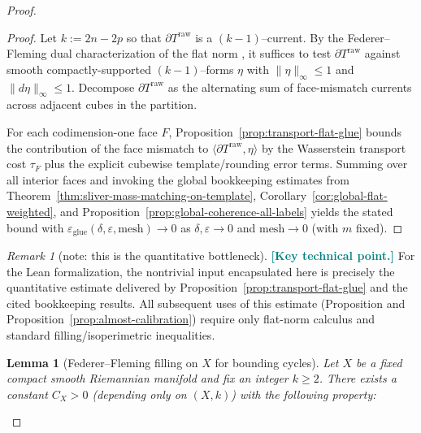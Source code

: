 \documentclass[11pt]{article}
\newcommand{\REVMZ}[1]{\textcolor{teal}{#1}}  %
\numberwithin{equation}{section}  %
\theoremstyle{plain}
\newtheorem{lemma}[theorem]{Lemma}
\theoremstyle{definition}
\theoremstyle{remark}
\newtheorem{remark}[theorem]{Remark}
\begin{document}
\begin{proof}
\begin{proof}
Let $k:=2n-2p$ so that $\partial T^{\mathrm{raw}}$ is a $(k-1)$--current.
By the Federer--Fleming
 dual characterization of the flat norm \REVMZ{\cite{FF60}}, it suffices to test $\partial T^{\mathrm{raw}}$
against smooth compactly-supported $(k-1)$--forms $\eta$ with $\|\eta\|_{\infty}\le 1$ and $\|d\eta\|_{\infty}\le 1$.
Decompose $\partial T^{\mathrm{raw}}$ as the alternating sum of face-mismatch currents across adjacent cubes in the partition.

For each codimension-one face $F$, Proposition~\ref{prop:transport-flat-glue} bounds the contribution of the face mismatch
to $\langle \partial T^{\mathrm{raw}},\eta\rangle$ by the Wasserstein transport cost $\tau_F$ plus the explicit cubewise
template/rounding error terms. Summing over all interior faces and invoking the global bookkeeping estimates from
Theorem~\ref{thm:sliver-mass-matching-on-template}, Corollary~\ref{cor:global-flat-weighted}, and
Proposition~\ref{prop:global-coherence-all-labels} yields the stated bound with
{$\varepsilon_{\mathrm{glue}}(\delta,\varepsilon,\mathrm{mesh})\to 0$ as $\delta,\varepsilon\to 0$ and $\mathrm{mesh}\to 0$} (with $m$ fixed).
\end{proof}

\begin{remark}[note: this is the quantitative bottleneck]\label{rem:lean-bottleneck-flatnorm}\label{rem:global-flat-note}
\REVMZ{\textbf{[Key technical point.]}}
For the Lean formalization, the nontrivial input encapsulated here is precisely the quantitative estimate delivered by
Proposition~\ref{prop:transport-flat-glue} and the cited bookkeeping results.
All subsequent uses of this estimate (Proposition and Proposition~\ref{prop:almost-calibration})
require only flat-norm calculus and standard filling/isoperimetric inequalities.
\end{remark}





\begin{lemma}[Federer--Fleming filling on $X$ for bounding cycles]\label{lem:FF-filling-X}
Let $X$ be a fixed compact smooth Riemannian manifold and fix an integer $k\ge 2$.
There exists a constant $C_X>0$ (depending only on $(X,k)$) with the following property:


\end{lemma}
\end{proof}
\end{document}

